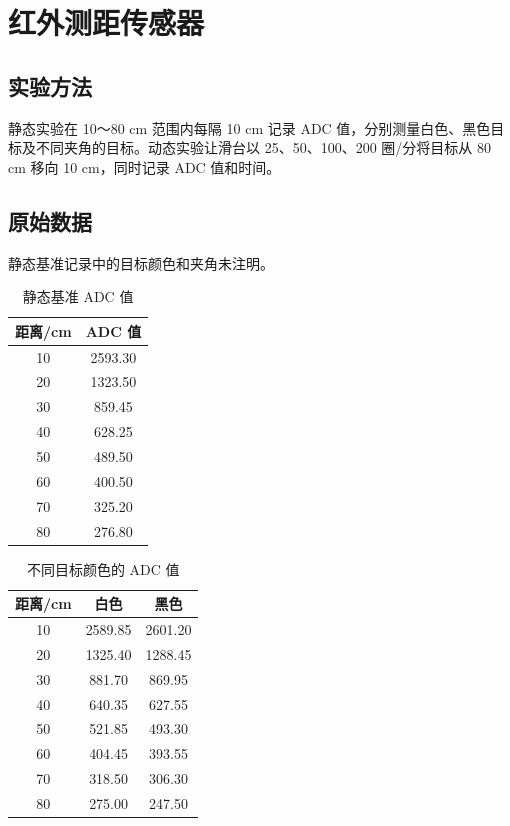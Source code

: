 \documentclass[UTF8,a4paper,12pt]{ctexart}
\begin{document}
\section{红外测距传感器}
\subsection{实验方法}
静态实验在 10～80 cm 范围内每隔 10 cm 记录 ADC 值，分别测量白色、黑色目标及不同夹角的目标。动态实验让滑台以 25、50、100、200 圈/分将目标从 80 cm 移向 10 cm，同时记录 ADC 值和时间。

\subsection{原始数据}
静态基准记录中的目标颜色和夹角未注明。

\begin{table}[H]
  \centering
  \caption{静态基准 ADC 值}
  \label{tab:distance-static}
  \begin{tabular}{cc}
    \toprule
    距离/cm & ADC 值 \\
    \midrule
    10 & 2593.30 \\
    20 & 1323.50 \\
    30 & 859.45 \\
    40 & 628.25 \\
    50 & 489.50 \\
    60 & 400.50 \\
    70 & 325.20 \\
    80 & 276.80 \\
    \bottomrule
  \end{tabular}
\end{table}

\begin{table}[H]
  \centering
  \caption{不同目标颜色的 ADC 值}
  \label{tab:distance-color}
  \begin{tabular}{ccc}
    \toprule
    距离/cm & 白色 & 黑色 \\
    \midrule
    10 & 2589.85 & 2601.20 \\
    20 & 1325.40 & 1288.45 \\
    30 & 881.70 & 869.95 \\
    40 & 640.35 & 627.55 \\
    50 & 521.85 & 493.30 \\
    60 & 404.45 & 393.55 \\
    70 & 318.50 & 306.30 \\
    80 & 275.00 & 247.50 \\
    \bottomrule
  \end{tabular}
\end{table}
\end{document}
